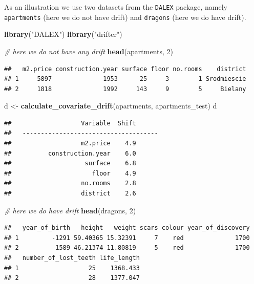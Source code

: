 \documentclass[12pt,]{krantz}
\newenvironment{Shaded}{\begin{snugshade}}{\end{snugshade}}
\newcommand{\CommentTok}[1]{\textcolor[rgb]{0.56,0.35,0.01}{\textit{#1}}}
\newcommand{\DecValTok}[1]{\textcolor[rgb]{0.00,0.00,0.81}{#1}}
\newcommand{\KeywordTok}[1]{\textcolor[rgb]{0.13,0.29,0.53}{\textbf{#1}}}
\newcommand{\NormalTok}[1]{#1}
\newcommand{\StringTok}[1]{\textcolor[rgb]{0.31,0.60,0.02}{#1}}
\begin{document}
As an illustration we use two datasets from the \texttt{DALEX} package, namely \texttt{apartments} (here we do not have drift) and \texttt{dragons} (here we do have drift).

\begin{Shaded}
\begin{Highlighting}[]
\KeywordTok{library}\NormalTok{(}\StringTok{"DALEX"}\NormalTok{)}
\KeywordTok{library}\NormalTok{(}\StringTok{"drifter"}\NormalTok{)}

\CommentTok{# here we do not have any drift}
\KeywordTok{head}\NormalTok{(apartments, }\DecValTok{2}\NormalTok{)}
\end{Highlighting}
\end{Shaded}

\begin{verbatim}
##   m2.price construction.year surface floor no.rooms    district
## 1     5897              1953      25     3        1 Srodmiescie
## 2     1818              1992     143     9        5     Bielany
\end{verbatim}

\begin{Shaded}
\begin{Highlighting}[]
\NormalTok{d <-}\StringTok{ }\KeywordTok{calculate_covariate_drift}\NormalTok{(apartments, apartments_test)}
\NormalTok{d}
\end{Highlighting}
\end{Shaded}

\begin{verbatim}
##                   Variable  Shift
##   -------------------------------------
##                   m2.price    4.9  
##          construction.year    6.0  
##                    surface    6.8  
##                      floor    4.9  
##                   no.rooms    2.8  
##                   district    2.6
\end{verbatim}

\begin{Shaded}
\begin{Highlighting}[]
\CommentTok{# here we do have drift}
\KeywordTok{head}\NormalTok{(dragons, }\DecValTok{2}\NormalTok{)}
\end{Highlighting}
\end{Shaded}

\begin{verbatim}
##   year_of_birth   height   weight scars colour year_of_discovery
## 1         -1291 59.40365 15.32391     7    red              1700
## 2          1589 46.21374 11.80819     5    red              1700
##   number_of_lost_teeth life_length
## 1                   25    1368.433
## 2                   28    1377.047
\end{verbatim}
\end{document}
